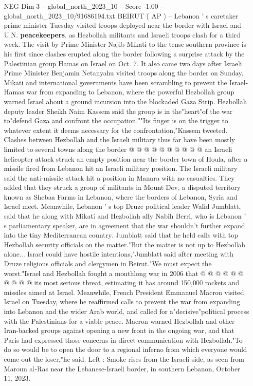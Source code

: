 \begin{textsample}{NEG Dim 3 – global\_north\_2023\_10 – Score -1.00 – global\_north\_2023\_10/91686194.txt}  \label{ex:f3_neg_186}
BEIRUT ( AP ) -- Lebanon ' s caretaker prime minister Tuesday visited troops deployed near the border with Israel and U.N. \textbf{peacekeepers}, as Hezbollah militants and Israeli troops clash for a third week.
The visit by Prime Minister Najib Mikati to the tense southern province is his first since clashes erupted along the border following a surprise attack by the Palestinian group Hamas on Israel on Oct. 7.
It also came two days after Israeli Prime Minister Benjamin Netanyahu visited troops along the border on Sunday.
Mikati and international governments have been scrambling to prevent the Israel-Hamas war from expanding to Lebanon, where the powerful Hezbollah group warned Israel about a ground incursion into the blockaded Gaza Strip.
Hezbollah deputy leader Sheikh Naim Kassem said the group is in the"heart"of the war to"defend Gaza and confront the occupation.""Its finger is on the trigger to whatever extent it deems necessary for the confrontation,"Kassem tweeted.
Clashes between Hezbollah and the Israeli military thus far have been mostly limited to several towns along the border @ @ @ @ @ @ @ @ @ @ an Israeli helicopter attack struck an empty position near the border town of Houla, after a missile fired from Lebanon hit an Israeli military position.
The Israeli military said the anti-missile attack hit a position in Manara with no casualties.
They added that they struck a group of militants in Mount Dov, a disputed territory known as Shebaa Farms in Lebanon, where the borders of Lebanon, Syria and Israel meet.
Meanwhile, Lebanon ' s top Druze political leader Walid Jumblatt, said that he along with Mikati and Hezbollah ally Nabih Berri, who is Lebanon ' s parliamentary speaker, are in agreement that the war shouldn't further expand into the tiny Mediterranean country.
Jumblatt said that he held calls with top Hezbollah security officials on the matter."But the matter is not up to Hezbollah alone...
Israel could have hostile intentions,"Jumblatt said after meeting with Druze religious officials and clergymen in Beirut."We must expect the worst."Israel and Hezbollah fought a monthlong war in 2006 that @ @ @ @ @ @ @ @ @ @ its most serious threat, estimating it has around 150,000 rockets and missiles aimed at Israel.
Meanwhile, French President Emmanuel Macron visited Israel on Tuesday, where he reaffirmed calls to prevent the war from expanding into Lebanon and the wider Arab world, and called for a"decisive"political process with the Palestinians for a viable peace.
Macron warned Hezbollah and other Iran-backed groups against opening a new front in the ongoing war, and that Paris had expressed those concerns in direct communication with Hezbollah."To do so would be to open the door to a regional inferno from which everyone would come out the loser,"he said.
Left : Smoke rises from the Israeli side, as seen from Maroun al-Ras near the Lebanese-Israeli border, in southern Lebanon, October 11, 2023.

\end{textsample}
